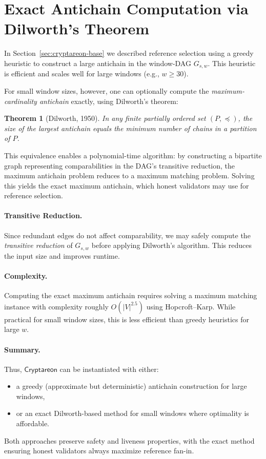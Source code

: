 \documentclass[11pt]{article}
\newtheorem{theorem}{Theorem}[section]
\newcommand{\Proj}{\ensuremath{\mathsf{Cryptareon}}\xspace}
\begin{document}
\section{Exact Antichain Computation via Dilworth's Theorem}
\label{sec:appendix-dilworth}

In Section~\ref{sec:cryptareon-base} we described reference selection using a greedy heuristic to construct a large antichain in the window-DAG $G_{s,w}$. This heuristic is efficient and scales well for large windows (e.g., $w \ge 30$). 

For small window sizes, however, one can optionally compute the \emph{maximum-cardinality antichain} exactly, using Dilworth's theorem:

\begin{theorem}[Dilworth, 1950]
In any finite partially ordered set $(P,\preceq)$, the size of the largest antichain equals the minimum number of chains in a partition of $P$.
\end{theorem}

This equivalence enables a polynomial-time algorithm: by constructing a bipartite graph representing comparabilities in the DAG's transitive reduction, the maximum antichain problem reduces to a maximum matching problem. Solving this yields the exact maximum antichain, which honest validators may use for reference selection.

\paragraph{Transitive Reduction.}
Since redundant edges do not affect comparability, we may safely compute the \emph{transitive reduction} of $G_{s,w}$ before applying Dilworth’s algorithm. This reduces the input size and improves runtime.

\paragraph{Complexity.}
Computing the exact maximum antichain requires solving a maximum matching instance with complexity roughly $O(|V|^{2.5})$ using Hopcroft–Karp. While practical for small window sizes, this is less efficient than greedy heuristics for large $w$.

\paragraph{Summary.}
Thus, \Proj can be instantiated with either:
\begin{itemize}
  \item a greedy (approximate but deterministic) antichain construction for large windows,
  \item or an exact Dilworth-based method for small windows where optimality is affordable.
\end{itemize}
Both approaches preserve safety and liveness properties, with the exact method ensuring honest validators always maximize reference fan-in.
\end{document}
